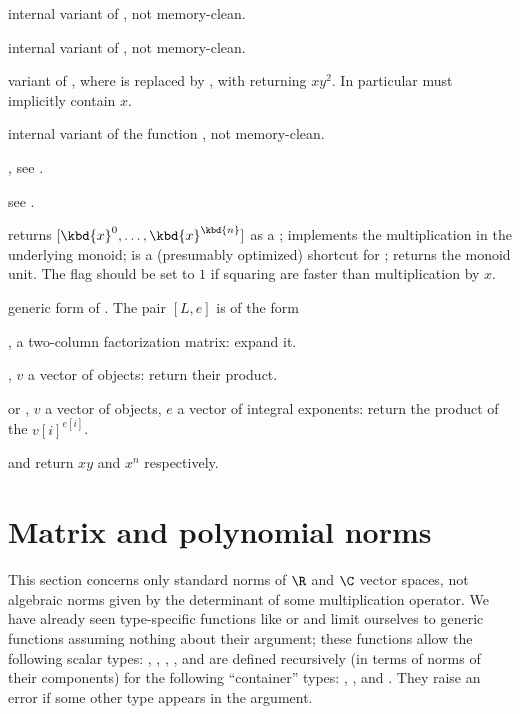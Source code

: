 internal variant of , not memory-clean.

internal variant of , not memory-clean.

 variant
of , where  is replaced by , with
 returning $xy^2$. In particular  must implicitly
contain $x$.

internal variant of the function , not memory-clean.

, see
.

see .

returns $[\kbd{x}^0, \dots, \kbd{x}^\kbd{n}]$ as a ;  implements the multiplication in the underlying monoid; 
is a (presumably optimized) shortcut for ; 
returns the monoid unit. The flag  should be set to $1$ if
squaring are faster than multiplication by $x$.

 generic form
of . The pair $[L,e]$ is of the form

\item \kbd{[fa, NULL]},  a two-column factorization matrix: expand it.

\item  \kbd{[v, NULL]}, $v$ a vector of objects: return their
product.

\item or \kbd{[v, e]},  $v$ a vector of objects, $e$ a vector of integral
exponents: return the product of the $v[i]^{e[i]}$.

\noindent {} and 
return $xy$ and $x^n$ respectively.

\section{Matrix and polynomial norms} This section concerns only standard norms
of $\R$ and $\C$ vector spaces, not algebraic norms given by the determinant of
some multiplication operator. We have already seen type-specific functions like
 or  and limit ourselves to generic functions
assuming nothing about their  argument; these functions allow
the following scalar types: , , , ,
 and are defined recursively (in terms of norms of their components)
for the following ``container'' types: , ,  and
. They raise an error if some other type appears in the argument.

